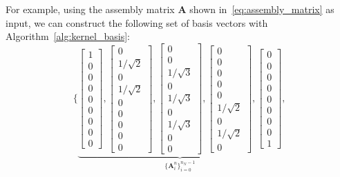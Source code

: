 For example, using the assembly matrix $\mathbf{A}$ shown in~\eqref{eq:assembly_matrix} as input, we can construct the following set of basis vectors with Algorithm~\ref{alg:kernel_basis}:
\begin{equation}
	\Biggl\{
	\underbrace{\begin{bmatrix} 1\\ 0\\ 0\\ 0\\ 0\\ 0\\ 0\\ 0\\ 0 \end{bmatrix},
		\begin{bmatrix} 0\\ 1/\sqrt{2}\\ 0\\ 1/\sqrt{2}\\ 0\\ 0\\ 0\\ 0\\ 0 \end{bmatrix},
		\begin{bmatrix} 0\\ 0\\ 1/\sqrt{3}\\ 0\\ 1/\sqrt{3}\\ 0\\ 1/\sqrt{3}\\ 0\\ 0 \end{bmatrix},
		\begin{bmatrix} 0\\ 0\\ 0\\ 0\\ 0\\ 1/\sqrt{2}\\ 0\\ 1/\sqrt{2}\\ 0 \end{bmatrix},
		\begin{bmatrix} 0\\ 0\\ 0\\ 0\\ 0\\ 0\\ 0\\ 0\\ 1 \end{bmatrix}}_{\{\mathbf{A}^n_i\}_{i=0}^{n_N-1}},

\end{equation}
